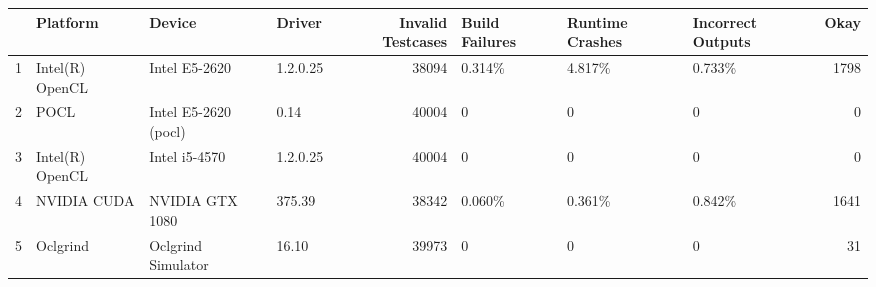 \begin{tabular}{llllrlllr}
\toprule
{} &         Platform &                Device &    Driver &  Invalid Testcases & Build Failures & Runtime Crashes & Incorrect Outputs &  Okay \\
\midrule
1 &  Intel(R) OpenCL &         Intel E5-2620 &  1.2.0.25 &              38094 &         0.314\% &          4.817\% &            0.733\% &  1798 \\
2 &             POCL &  Intel E5-2620 (pocl) &      0.14 &              40004 &              0 &               0 &                 0 &     0 \\
3 &  Intel(R) OpenCL &         Intel i5-4570 &  1.2.0.25 &              40004 &              0 &               0 &                 0 &     0 \\
4 &      NVIDIA CUDA &       NVIDIA GTX 1080 &    375.39 &              38342 &         0.060\% &          0.361\% &            0.842\% &  1641 \\
5 &         Oclgrind &    Oclgrind Simulator &     16.10 &              39973 &              0 &               0 &                 0 &    31 \\
\bottomrule
\end{tabular}
